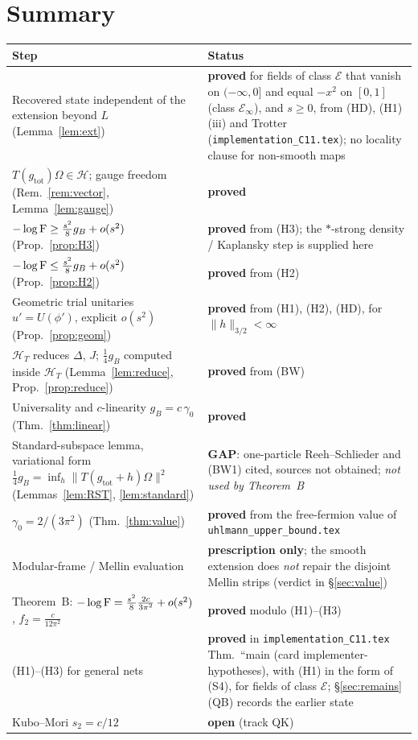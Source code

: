 \documentclass[11pt]{article}
\newcommand{\Om}{\Omega}
\newcommand{\Hil}{\mathcal H}
\newcommand{\norm}[1]{\lVert#1\rVert}
\newcommand{\gB}{g_B}
\newcommand{\HT}{\Hil_T}
\newcommand{\gtot}{g_{\mathrm{tot}}}
\begin{document}
\section{Summary}\label{sec:summary}

\begin{center}\small
\begin{tabular}{@{}p{}p{}@{}}\toprule
\textbf{Step} & \textbf{Status}\\\midrule
Recovered state independent of the extension beyond $L$ (Lemma~\ref{lem:ext})
 & \textbf{proved} for fields of class $\mathcal E$ that vanish on $(-\infty,0]$ and equal $-x^2$ on $[0,1]$ (class $\mathcal E_\infty$), and $s\ge0$, from (HD), (H1)(iii) and Trotter (\texttt{implementation\_C11.tex}); no locality clause for non-smooth maps\\
$T(\gtot)\Om\in\Hil$; gauge freedom (Rem.~\ref{rem:vector}, Lemma~\ref{lem:gauge})
 & \textbf{proved}\\
$-\log\Fid\ge\frac{s^2}8\gB+o(s^2)$ (Prop.~\ref{prop:H3})
 & \textbf{proved} from (H3); the $*$-strong density / Kaplansky step is supplied here\\
$-\log\Fid\le\frac{s^2}8\gB+o(s^2)$ (Prop.~\ref{prop:H2})
 & \textbf{proved} from (H2)\\
Geometric trial unitaries $u'=U(\phi')$, explicit $o(s^2)$ (Prop.~\ref{prop:geom})
 & \textbf{proved} from (H1), (H2), (HD), for $\norm h_{3/2}<\infty$\\
$\HT$ reduces $\Delta$, $J$; $\frac14\gB$ computed inside $\HT$ (Lemma~\ref{lem:reduce},
 Prop.~\ref{prop:reduce}) & \textbf{proved} from (BW)\\
Universality and $c$-linearity $\gB=c\,\gamma_0$ (Thm.~\ref{thm:linear})
 & \textbf{proved}\\
Standard-subspace lemma, variational form $\frac14\gB=\inf_h\norm{T(\gtot+h)\Om}^2$
 (Lemmas~\ref{lem:RST}, \ref{lem:standard}) & \textbf{GAP}: one-particle Reeh--Schlieder and (BW1) cited,
 sources not obtained; \emph{not used by Theorem~B}\\
$\gamma_0=2/(3\pi^2)$ (Thm.~\ref{thm:value})
 & \textbf{proved} from the free-fermion value of \texttt{uhlmann\_upper\_bound.tex}\\
Modular-frame / Mellin evaluation
 & \textbf{prescription only}; the smooth extension does \emph{not} repair the disjoint Mellin strips
 (verdict in \S\ref{sec:value})\\
Theorem~B: $-\log\operatorname{F}=\frac{s^2}8\frac{2c}{3\pi^2}+o(s^2)$, $f_2=\frac c{12\pi^2}$
 & \textbf{proved} modulo (H1)--(H3)\\
(H1)--(H3) for general nets & \textbf{proved} in \texttt{implementation\_C11.tex} Thm.~``main (card implementer-hypotheses), with (H1) in the form of (S4), for fields of class $\mathcal E$; \S\ref{sec:remains}(QB) records the earlier state\\
Kubo--Mori $s_2=c/12$ & \textbf{open} (track QK)\\\bottomrule
\end{tabular}
\end{center}
\end{document}
